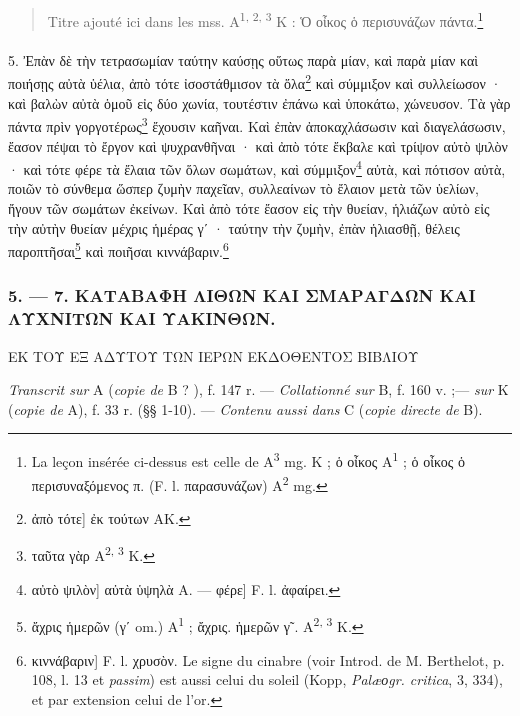 \documentclass[a4paper, 11pt, oneside, polutonikogreek, french]{article}
\begin{document}
\begin{quotation}
Titre ajouté ici dans les mss. A\textsuperscript{1, 2, 3} K : Ὁ οἶκος ὁ περισυνάζων πάντα.\footnote{La leçon insérée ci-dessus est celle de A\textsuperscript{3} mg. K ; ὁ οἶκος A\textsuperscript{1} ; ὁ οἶκος ὁ περισυναξόμενος π. (F. l. παρασυνάζων) A\textsuperscript{2} mg.}
\end{quotation}
\paragraph{}
5. Ἐπὰν δὲ τὴν τετρασωμίαν ταύτην καύσῃς οὕτως παρὰ μίαν, καὶ παρὰ μίαν καὶ ποιήσῃς αὐτὰ ὑέλια, ἀπὸ τότε ἰσοστάθμισον τὰ ὅλα\footnote{ἀπὸ τότε] ἐκ τούτων AK.} καὶ σύμμιξον καὶ συλλείωσον · καὶ βαλὼν αὐτὰ ὁμοῦ εἰς δύο χωνία, τουτέστιν ἐπάνω καὶ ὑποκάτω, χώνευσον. Τὰ γὰρ πάντα πρὶν γοργοτέρως\footnote{ταῦτα γὰρ A\textsuperscript{2, 3} K.} ἔχουσιν καῆναι. Καὶ ἐπὰν ἀποκαχλάσωσιν καὶ διαγελάσωσιν, ἔασον πέψαι τὸ ἔργον καὶ ψυχρανθῆναι · καὶ ἀπὸ τότε ἔκβαλε καὶ τρίψον αὐτὸ ψιλὸν · καὶ τότε φέρε τὰ ἔλαια τῶν ὅλων σωμάτων, καὶ σύμμιξον\footnote{αὐτὸ ψιλὸν] αὐτὰ ὑψηλὰ A. --- φέρε] F. l. ἀφαίρει.} αὐτὰ, καὶ πότισον αὐτὰ, ποιῶν τὸ σύνθεμα ὥσπερ ζυμὴν παχεῖαν, συλλεαίνων τὸ ἔλαιον μετὰ τῶν ὑελίων, ἤγουν τῶν σωμάτων ἐκείνων. Καὶ ἀπὸ τότε ἔασον εἰς τὴν θυείαν, ἡλιάζων αὐτὸ εἰς τὴν αὐτὴν θυείαν μέχρις ἡμέρας γʹ · ταύτην τὴν ζυμὴν, ἐπὰν ἡλιασθῇ, θέλεις παροπτῆσαι\footnote{ἄχρις ἡμερῶν (γʹ om.) A\textsuperscript{1} ; ἄχρις. ἡμερῶν γ῀. A\textsuperscript{2, 3} K.} καὶ ποιῆσαι κιννάβαριν.\footnote{κιννάβαριν] F. l. χρυσὸν. Le signe du cinabre (voir Introd. de M. Berthelot, p. 108, l. 13 et \emph{passim}) est aussi celui du soleil (Kopp, \emph{Palæοgr. critica}, 3, 334), et par extension celui de l'or.}

\bigskip
\centerline{\EightStarTaper}
\centerline{\EightStarTaper\EightStarTaper}
\bigskip

\subsubsection{5. --- 7. ΚΑΤΑΒΑΦΗ ΛΙΘΩΝ ΚΑΙ ΣΜΑΡΑΓΔΩΝ ΚΑΙ ΛΥΧΝΙΤΩΝ ΚΑΙ ΥΑΚΙΝΘΩΝ.}

ΕΚ ΤΟΥ ΕΞ ΑΔΥΤΟΥ ΤΩΝ ΙΕΡΩΝ ΕΚΔΟΘΕΝΤΟΣ ΒΙΒΛΙΟΥ

\emph{Transcrit sur} A (\emph{copie de} B ? ), f. 147 r. --- \emph{Collationné sur} B, f. 160 v. ;--- \emph{sur} K (\emph{copie de} A), f. 33 r. (§§ 1-10). --- \emph{Contenu aussi dans} C (\emph{copie directe de} B).

\bigskip
\end{document}
